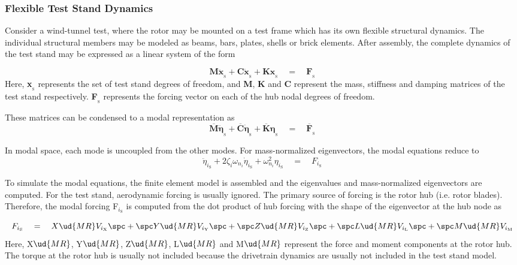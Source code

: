 \subsubsection{Flexible Test Stand Dynamics}
Consider a wind-tunnel test, where the rotor may be mounted on a test frame which has its own flexible structural dynamics. The individual structural members may be modeled as beams, bars, plates, shells or brick elements. After assembly, the complete dynamics of the test stand may be expressed as a linear system of the form 

\begin{equation}
\textbf{M} \ddot{\textbf{x}}_{_\textrm{S}} + \textbf{C} \dot{\textbf{x}}_{_\textrm{S}} + \textbf{K} \textbf{x}_{_\textrm{S}} \quad = \quad \textbf{F}_{_\textrm{S}}
\end{equation}
Here, \textbf{x}$_{_\textrm{S}}$ represents the set of test stand degrees of freedom, and \textbf{M}, \textbf{K} and \textbf{C} represent the mass, stiffness and damping matrices of the test stand respectively. \textbf{F}$_{_\textrm{S}}$ represents the forcing vector on each of the hub nodal degrees of freedom. 

These matrices can be condensed to a modal representation as   
\begin{equation}
\overline{\textbf{M}} \ddot{\boldsymbol{\eta}}_{_\textrm{S}} + \overline{\textbf{C}} \dot{\boldsymbol{\eta}}_{_\textrm{S}} + \overline{\textbf{K}} \boldsymbol{\eta}_{_\textrm{S}} \quad = \quad \overline{\textbf{F}}_{_\textrm{S}}
\end{equation}

In modal space, each mode is uncoupled from the other modes. For mass-normalized eigenvectors, the modal equations reduce to 
\begin{equation}
\ddot{\eta}_{i_\textrm{S}} + 2\zeta_i \omega_{n_i} \dot{\eta}_{i_\textrm{S}} + \omega_{n_i}^2 \eta_{i_\textrm{S}} \quad = \quad F_{i_\textrm{S}}
\end{equation}

To simulate the modal equations, the finite element model is assembled and the eigenvalues and mass-normalized eigenvectors are computed. For the test stand, aerodynamic forcing is usually ignored. The primary source of forcing is the rotor hub (i.e. rotor blades). Therefore, the modal forcing F$_{i_\textrm{S}}$ is computed from the dot product of hub forcing with the shape of the eigenvector at the hub node as  

\begin{equation}
F_{i_\textrm{S}} \quad = \quad X\ud{MR} V_{i_\textrm{X}} \spc + \spc Y\ud{MR} V_{i_\textrm{Y}} \spc + \spc Z\ud{MR} V_{i_\textrm{Z}} \spc + \spc L\ud{MR} V_{i_\textrm{L}} \spc + \spc M\ud{MR} V_{i_\textrm{M}} 
\end{equation}
Here, X$\ud{MR}$, Y$\ud{MR}$, Z$\ud{MR}$, L$\ud{MR}$ and M$\ud{MR}$ represent the force and moment components at the rotor hub. The torque at the rotor hub is usually not included because the drivetrain dynamics are usually not included in the test stand model.

